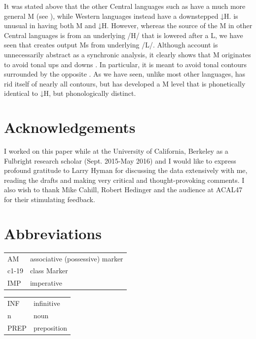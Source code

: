 \documentclass[output=paper,modfonts,nonflat,
colorlinks, citecolor=brown,
draftmode,
draft
]{langsci/langscibook}
\begin{document}
It was stated above that the other Central  languages such as  have a much more general M  (see \citealt{hyman2005}), while Western   languages instead have a downstepped ↓H.  is unusual in having both M and ↓H. However, whereas the source of the M in other Central  languages is from an underlying /H/ that is lowered after a L, we have seen that  creates output Ms from underlying /L/. Although  account is unnecessarily abstract as a synchronic analysis, it clearly shows that M  originates to avoid tonal ups and downs \citep[15]{hyman2010}. In particular, it is meant to avoid tonal contours surrounded by the opposite . As we have seen, unlike most other  languages,  has rid itself of nearly all contours, but has developed a M  level that is phonetically identical to ↓H, but phonologically distinct. 

\section*{Acknowledgements}

I worked on this paper while at the University of California, Berkeley as a Fulbright research scholar (Sept. 2015-May 2016) and I would like to express profound gratitude to Larry Hyman for discussing the data extensively with me, reading the drafts and making very critical and thought-provoking comments. I also wish to thank Mike Cahill, Robert Hedinger and the audience at ACAL47 for their stimulating feedback.

\section*{Abbreviations}
\begin{tabularx}{.55\textwidth}{ll}
AM & associative (possessive) marker \\
c1-19 & class Marker \\
IMP & imperative \\
\end{tabularx}
\begin{tabularx}{.45\textwidth}{ll}
INF & infinitive\\
n & noun\\
PREP & preposition\\
\end{tabularx}

\end{document}
